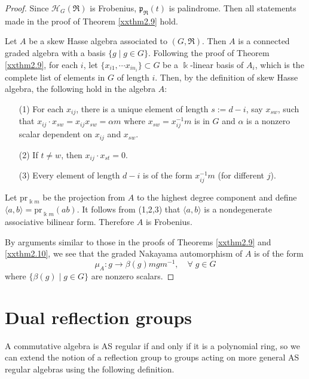 \begin{proof} Since ${\mathcal H}_G(\Re)$ is Frobenius,
${\mathfrak{p}}_\Re(t)$ is palindrome. Then all statements made in the 
proof of Theorem \ref{xxthm2.9} hold. 

Let $A$ be a skew Hasse algebra associated to $(G,\Re)$. Then 
$A$ is a connected graded algebra with a basis $\{g\mid g\in G\}$.
Following the proof of Theorem \ref{xxthm2.9}, for each $i$, let 
$\{x_{i1},\cdots x_{in_i}\}\subset G$ be a $\Bbbk$-linear basis 
of $A_i$, which is the complete list of elements in $G$ of length $i$. 
Then, by the definition of skew Hasse algebra, the following 
hold in the algebra $A$:
\begin{enumerate}
\item[(1)]
For each $x_{ij}$, there is a unique element of length 
$s:=d-i$, say $x_{sw}$, such that $x_{ij}\cdot x_{sw}=x_{ij} x_{sw}=
\alpha m$ where $x_{sw}=x_{ij}^{-1}m$ is in $G$ and $\alpha$ is a nonzero
scalar dependent on $x_{ij}$ and $x_{sw}$. 
\item[(2)]
If $t\neq w$, then $x_{ij}\cdot x_{st}=0$.
\item[(3)]
Every element 
of length $d-i$ is of the form $x_{ij}^{-1}m$ (for different $j$). 
\end{enumerate}
Let ${\text{pr}}_{\Bbbk m}$ be the projection from $A$ to 
the highest degree component and define $\langle a,b\rangle={\text{pr}}_{\Bbbk m}(ab)$.
It follows from (1,2,3) that $\langle a,b\rangle$ is a nondegenerate
associative bilinear form. Therefore $A$ is Frobenius.

By arguments similar to those in the proofs of Theorems \ref{xxthm2.9} and \ref{xxthm2.10}, we see that
the graded Nakayama automorphism of $A$ is of the form
\begin{equation}
\label{E2.11.1}\tag{E2.11.1}
\mu_A: g\to \beta(g) mg m^{-1}, \quad \forall \; g\in G
\end{equation}
where $\{\beta(g)\mid g\in G\}$ are nonzero scalars.
\end{proof}

\section{Dual reflection groups}
\label{xxsec3}

A commutative algebra is AS regular if and only if it is a polynomial ring, so we
can extend the notion of a reflection group to groups acting on more general AS regular algebras using the following definition.

